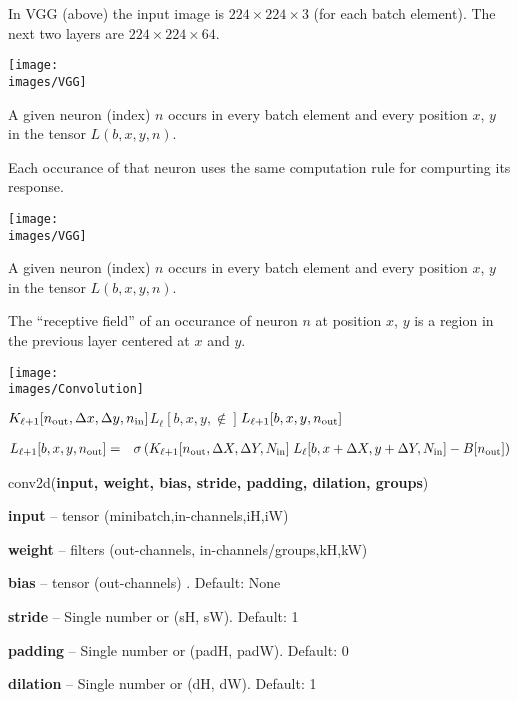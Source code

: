 {\vfill
In VGG (above) the input image is $224\times224\times3$ (for each batch element).  The next two layers are $224\times224\times64$.

\vfill
\centerline{\texttt{[image: \\images/VGG]}}

A given neuron (index) $n$ occurs in every batch element and every position $x$, $y$ in the tensor $L(b,x,y,n)$.

\vfill
Each occurance of that neuron uses the same computation rule for compurting its response.

\vfill
\centerline{\texttt{[image: \\images/VGG]}}

A given neuron (index) $n$ occurs in every batch element and every position $x$, $y$ in the tensor $L(b,x,y,n)$.

\vfill
The ``receptive field'' of an occurance of neuron $n$ at position $x$, $y$ is a region in the previous layer centered at
$x$ and $y$.



\centerline{\texttt{[image: \\images/Convolution]}}
{\huge \centerline{$K_{\ell+1}[n_{\mathrm{out}},\Delta x,\Delta y,n_{\mathrm{in}}]$\hspace{6ex}$L_{{\ell}}[b,x,y,\nin]$\hspace{6ex}$L_{{\ell+1}}[b,x,y,n_{\mathrm{out}}]$}

\begin{eqnarray*}
L_{{\ell+1}}[b,x,y,n_{\mathrm{out}}]  & = &   \sigma\left(K_{\ell+1}[n_{\mathrm{out}},\Delta X, \Delta Y,N_{\mathrm{in}}]\; L_{{\ell}}[b,x + \Delta X, y + \Delta Y, N_{\mathrm{in}}] - B[n_{\mathrm{out}}]\right)
\end{eqnarray*}
}


conv2d({\bf input, weight, bias, stride, padding, dilation, groups})

\bigskip
{\bf input} – tensor (minibatch,in-channels,iH,iW)

\medskip
{\bf weight} – filters (out-channels, in-channels/groups,kH,kW)

\medskip
{\bf bias} – tensor (out-channels) . Default: None

\medskip
{\bf stride} – Single number or (sH, sW). Default: 1

\medskip
{\bf padding} – Single number or (padH, padW). Default: 0

\medskip
{\bf dilation} – Single number or (dH, dW). Default: 1

}
